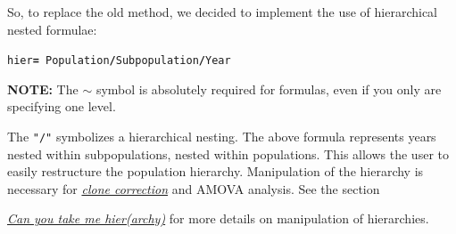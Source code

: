 \documentclass[letterpaper]{article}\usepackage[]{graphicx}\usepackage[]{color}
\makeatletter
\newcommand{\hlopt}[1]{\textcolor[rgb]{1,0,0.502}{\textbf{#1}}}%
\newcommand{\hlstd}[1]{\textcolor[rgb]{0,0,0}{#1}}%
\newcommand{\hlkwb}[1]{\textcolor[rgb]{0.502,0.502,0.753}{\textbf{#1}}}%
\newenvironment{kframe}{%
 \def\at@end@of@kframe{}%
 \ifinner\ifhmode%
  \def\at@end@of@kframe{\end{minipage}}%
  \begin{minipage}{\columnwidth}%
 \fi\fi%
 \def\FrameCommand##1{\hskip\@totalleftmargin \hskip-\fboxsep
 \colorbox{shadecolor}{##1}\hskip-\fboxsep
     \hskip-\linewidth \hskip-\@totalleftmargin \hskip\columnwidth}%
 \MakeFramed {\advance\hsize-\width
   \@totalleftmargin\z@ \linewidth\hsize
   \@setminipage}}%
 {\par\unskip\endMakeFramed%
 \at@end@of@kframe}
\newenvironment{knitrout}{}{} %
\newcommand{\tab}{\hspace*{1em}}
\newcommand{\seclink}[2]{
  \textit{\hyperref[#1]{#2}}
}
\makeatother
\begin{document}
So, to replace the old method, we decided to implement the use of hierarchical
nested formulae:
\begin{knitrout}\footnotesize
{}\color{fgcolor}\begin{kframe}
\begin{alltt}
\hlstd{hier} \hlkwb{=} \hlopt{~}\hlstd{Population}\hlopt{/}\hlstd{Subpopulation}\hlopt{/}\hlstd{Year}
\end{alltt}
\end{kframe}
\end{knitrout}

\textbf{NOTE:} The $\sim$ symbol is absolutely required for formulas, even if you only 
are specifying one level.

The \texttt{"/"} symbolizes a hierarchical nesting. The above formula represents
years nested within subpopulations, nested within populations. This allows the
user to easily restructure the population hierarchy. Manipulation of the hierarchy
is necessary for \seclink{data.manip:cc}{clone correction} and AMOVA analysis. See the section 
\seclink{data.manip:hier}{Can you take me hier(archy)} for more details on manipulation of hierarchies. 
% 
% 
\end{document}
